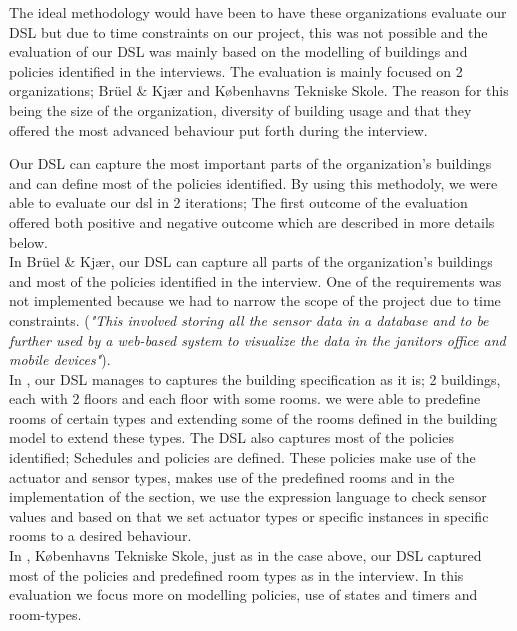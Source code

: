 The ideal methodology would have been to have these organizations evaluate our DSL but due to time constraints on our project, this was not possible and the evaluation of our DSL was mainly based on the modelling of buildings and policies identified in the interviews. The evaluation is mainly focused on 2 organizations; Br\"{u}el \& Kj\ae r and K\o benhavns Tekniske Skole. The reason for this being the size of the organization, diversity of building usage and that they offered the most advanced behaviour put forth during the interview. 

Our DSL can capture the most important parts of the
organization's buildings and can define most of the policies identified. By using this methodoly, we were able to evaluate our dsl in 2 iterations; The first outcome of the evaluation offered both positive and negative outcome which are described in more details below.\\

In Br\"{u}el \& Kj\ae r, our DSL can capture all parts of the organization's buildings and most of the policies identified in the interview. One of the requirements was not implemented because we had to narrow the scope of the project due to time constraints. (\textit{"This involved storing all the sensor data in a database and to be further used by a web-based system to visualize the data in the janitors office and mobile devices"}).\\
In , our DSL manages to captures the building specification as it is; 2 buildings, each with 2 floors and each floor with some rooms. we were able to predefine rooms of certain types and extending some of the rooms defined in the building model to extend these types. The DSL also captures most of the policies identified; Schedules and policies are defined. These policies make use of the actuator and sensor types, makes use of the predefined rooms and in the implementation of the section, we use the expression language to check sensor values and based on that we set actuator types or specific instances in specific rooms to a desired behaviour. \\

In  , K\o benhavns Tekniske Skole, just as in the case above, our DSL captured most of the policies and predefined room types as in the interview. In this evaluation we focus more on modelling policies, use of states and timers and room-types.\\ 

